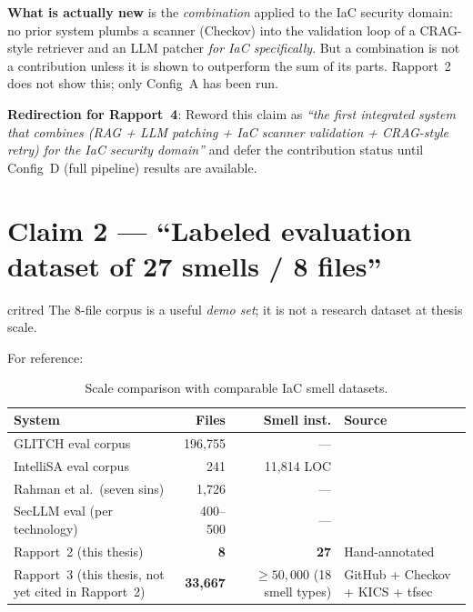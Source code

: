 \documentclass[11pt, a4paper]{report}
\begin{document}
\textbf{What is actually new} is the \emph{combination} applied to the IaC
security domain: no prior system plumbs a scanner (Checkov) into the validation
loop of a CRAG-style retriever and an LLM patcher \emph{for IaC specifically}.
But a combination is not a contribution unless it is shown to outperform the
sum of its parts. Rapport~2 does not show this; only Config~A has been run.

\textbf{Redirection for Rapport~4}: Reword this claim as
\emph{``the first integrated system that combines (RAG + LLM patching + IaC
scanner validation + CRAG-style retry) for the IaC security domain''} and
defer the contribution status until Config~D (full pipeline) results are
available.

\section{Claim 2 --- ``Labeled evaluation dataset of 27 smells / 8 files''}

\begin{gradebox}{critred}
The 8-file corpus is a useful \emph{demo set}; it is not a research dataset
at thesis scale.
\end{gradebox}

For reference:

\begin{table}[H]
  \centering
  \small
  \caption{Scale comparison with comparable IaC smell datasets.}
  \label{tab:dataset_scale}
  \begin{tabularx}{\linewidth}{lrrX}
    \toprule
    \textbf{System} & \textbf{Files} & \textbf{Smell inst.}
    & \textbf{Source} \\
    \midrule
    GLITCH eval corpus & 196{,}755 & --- &
    \citep{saavedra2022glitch} \\
    IntelliSA eval corpus & 241 & 11{,}814 LOC &
    \citep{intellisa2026} \\
    Rahman et al.\ (seven sins) & 1{,}726 & --- &
    \citep{rahman2019seven} \\
    SecLLM eval (per technology) & 400--500 & --- &
    \citep{devito2025secllm} \\
    \midrule
    Rapport~2 (this thesis) & \textbf{8} & \textbf{27} &
    Hand-annotated \\
    \midrule
    Rapport~3 (this thesis, not yet cited in Rapport~2) &
    \textbf{33{,}667} & $\geq 50{,}000$ (18 smell types) &
    GitHub + Checkov + KICS + tfsec \\
    \bottomrule
  \end{tabularx}
\end{table}
\end{document}
